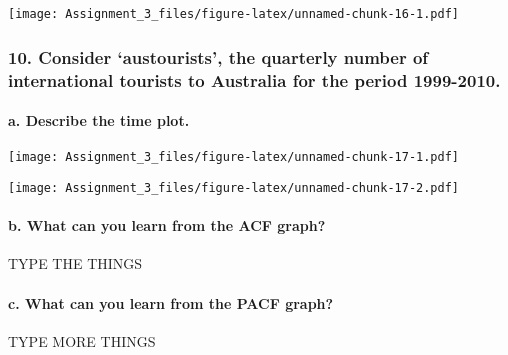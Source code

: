\documentclass[]{article}
\newenvironment{Shaded}{\begin{snugshade}}{\end{snugshade}}
\newcommand{\KeywordTok}[1]{\textcolor[rgb]{0.13,0.29,0.53}{\textbf{#1}}}
\newcommand{\StringTok}[1]{\textcolor[rgb]{0.31,0.60,0.02}{#1}}
\newcommand{\OperatorTok}[1]{\textcolor[rgb]{0.81,0.36,0.00}{\textbf{#1}}}
\newcommand{\NormalTok}[1]{#1}
\let\oldparagraph\paragraph
\renewcommand{\paragraph}[1]{\oldparagraph{#1}\mbox{}}
\begin{document}
\texttt{[image: Assignment\_3\_files/figure-latex/unnamed-chunk-16-1.pdf]}

\subsubsection{\texorpdfstring{10. Consider `austourists', the quarterly
number of international tourists to Australia for the period
1999-2010.}{10. Consider austourists, the quarterly number of international tourists to Australia for the period 1999-2010.}}\label{consider-austourists-the-quarterly-number-of-international-tourists-to-australia-for-the-period-1999-2010.}

\paragraph{a. Describe the time plot.}\label{a.-describe-the-time-plot.}

\begin{Shaded}
\end{Shaded}

\texttt{[image: Assignment\_3\_files/figure-latex/unnamed-chunk-17-1.pdf]}

\begin{Shaded}
\end{Shaded}

\texttt{[image: Assignment\_3\_files/figure-latex/unnamed-chunk-17-2.pdf]}

\paragraph{b. What can you learn from the ACF
graph?}\label{b.-what-can-you-learn-from-the-acf-graph}

TYPE THE THINGS

\paragraph{c. What can you learn from the PACF
graph?}\label{c.-what-can-you-learn-from-the-pacf-graph}

TYPE MORE THINGS
\end{document}
